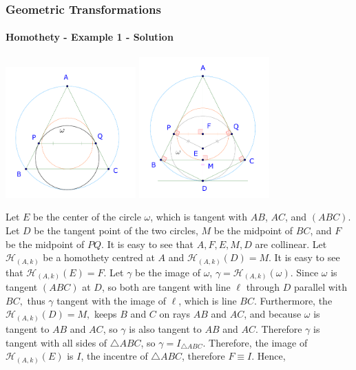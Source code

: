 \documentclass[8pt,xcolor=table,dvipsnames]{beamer}
\begin{document}
\begin{frame}[t]
    \frametitle{Geometric Transformations}
    \framesubtitle{Homothety - Example 1 - Solution}
    \begin{center}
        \begin{overprint}
            \centering\includegraphics[width=5cm]{./svg/pdf/imo-1978-4-0.pdf}
            \centering\includegraphics[width=5cm]{./svg/pdf/imo-1978-4-1.pdf}
        \end{overprint}        
    \end{center}
    \begin{overprint}
        Let $E$ be the center of the circle $\omega$, which is tangent with $AB$, $AC$, and $(ABC)$.
        Let $D$ be the tangent point of the two circles, $M$ be the midpoint of $BC$, and $F$ be the midpoint of $PQ$.
        It is easy to see that $A,F,E,M,D$ are collinear.
        Let $\mathcal{H}_{(A,k)}$ be a homothety centred at $A$ and $\mathcal{H}_{(A,k)}(D)=M.$
        It is easy to see that $\mathcal{H}_{(A,k)}(E)=F.$
        Let $\gamma$ be the image of $\omega$, $\gamma=\mathcal{H}_{(A,k)}(\omega).$
        Since $\omega$ is tangent $(ABC)$ at $D$, so both are tangent with line $\ell$ through $D$ parallel with $BC,$
        thus $\gamma$ tangent with the image of $\ell$, which is line $BC$.
        Furthermore, the $\mathcal{H}_{(A,k)}(D)=M,$ keeps $B$ and $C$ on rays $AB$ and $AC$, and because $\omega$ is tangent to $AB$ and $AC$,
        so $\gamma$ is also tangent to $AB$ and $AC$.
        Therefore $\gamma$ is tangent with all sides of $\triangle ABC$, so $\gamma = I_{\triangle ABC}.$
        Therefore, the image of $\mathcal{H}_{(A,k)}(E)$ is $I$, the incentre of $\triangle ABC$, therefore $F \equiv I.$
        Hence, 
    \end{overprint}        
\end{frame}
\end{document}
